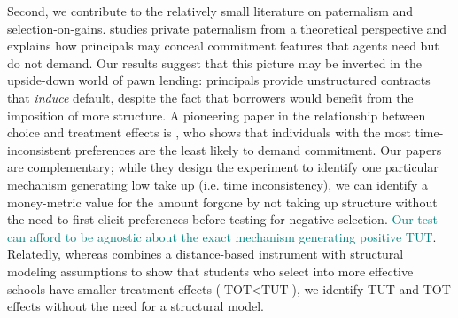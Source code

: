 \documentclass[12pt, a4paper, colorinlistoftodos]{article}
\begin{document}

Second, we contribute to the relatively small literature on paternalism and selection-on-gains. \cite{Laibson2018} studies private paternalism from a theoretical perspective and explains how principals may conceal commitment features that agents need but do not demand. Our results suggest that this picture may be inverted in the upside-down world of pawn lending:  principals provide unstructured contracts that \textit{induce} default, despite the fact that borrowers would benefit from the imposition of more structure.
A pioneering paper in the relationship between choice and treatment effects is \cite{Sprenger}, who shows that individuals with the most time-inconsistent preferences are the least likely to demand commitment. Our papers are complementary; while they design the experiment to identify one particular mechanism generating low take up (i.e. time inconsistency), we can identify a money-metric value for the amount forgone by not taking up structure without the need to first elicit preferences before testing for negative selection. \textcolor{teal}{Our test can afford to be agnostic about the exact mechanism generating positive TUT}. Relatedly, whereas \cite{Walters} combines a distance-based instrument with structural modeling assumptions to show that students who select into more effective schools have smaller treatment effects ($\text{TOT} < \text{TUT}$), we identify TUT and TOT effects without the need for a structural model.
\end{document}
